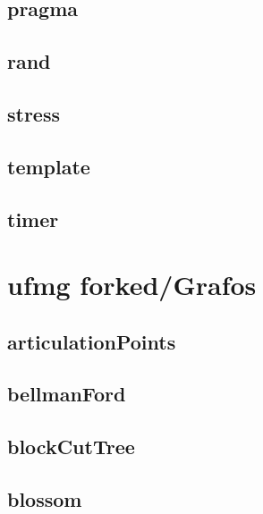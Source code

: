 \subsection{pragma}
\raggedbottom
\hrulefill
\subsection{rand}
\raggedbottom
\hrulefill
\subsection{stress}
\raggedbottom
\hrulefill
\subsection{template}
\raggedbottom
\hrulefill
\subsection{timer}
\raggedbottom
\hrulefill

\section{ufmg forked/Grafos}
\subsection{articulationPoints}
\raggedbottom
\hrulefill
\subsection{bellmanFord}
\raggedbottom
\hrulefill
\subsection{blockCutTree}
\raggedbottom
\hrulefill
\subsection{blossom}
\raggedbottom
\hrulefill
